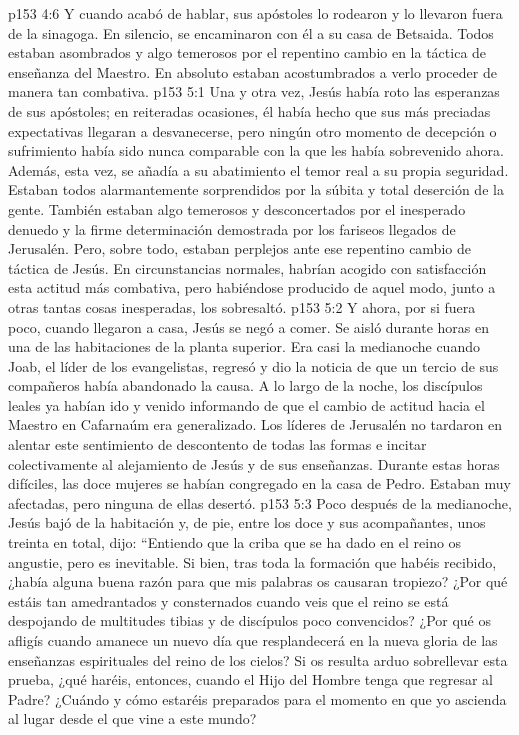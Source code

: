 \vs p153 4:6 Y cuando acabó de hablar, sus apóstoles lo rodearon y lo llevaron fuera de la sinagoga. En silencio, se encaminaron con él a su casa de Betsaida. Todos estaban asombrados y algo temerosos por el repentino cambio en la táctica de enseñanza del Maestro. En absoluto estaban acostumbrados a verlo proceder de manera tan combativa.
\vs p153 5:1 Una y otra vez, Jesús había roto las esperanzas de sus apóstoles; en reiteradas ocasiones, él había hecho que sus más preciadas expectativas llegaran a desvanecerse, pero ningún otro momento de decepción o sufrimiento había sido nunca comparable con la que les había sobrevenido ahora. Además, esta vez, se añadía a su abatimiento el temor real a su propia seguridad. Estaban todos alarmantemente sorprendidos por la súbita y total deserción de la gente. También estaban algo temerosos y desconcertados por el inesperado denuedo y la firme determinación demostrada por los fariseos llegados de Jerusalén. Pero, sobre todo, estaban perplejos ante ese repentino cambio de táctica de Jesús. En circunstancias normales, habrían acogido con satisfacción esta actitud más combativa, pero habiéndose producido de aquel modo, junto a otras tantas cosas inesperadas, los sobresaltó.
\vs p153 5:2 Y ahora, por si fuera poco, cuando llegaron a casa, Jesús se negó a comer. Se aisló durante horas en una de las habitaciones de la planta superior. Era casi la medianoche cuando Joab, el líder de los evangelistas, regresó y dio la noticia de que un tercio de sus compañeros había abandonado la causa. A lo largo de la noche, los discípulos leales ya habían ido y venido informando de que el cambio de actitud hacia el Maestro en Cafarnaúm era generalizado. Los líderes de Jerusalén no tardaron en alentar este sentimiento de descontento de todas las formas e incitar colectivamente al alejamiento de Jesús y de sus enseñanzas. Durante estas horas difíciles, las doce mujeres se habían congregado en la casa de Pedro. Estaban muy afectadas, pero ninguna de ellas desertó.
\vs p153 5:3 Poco después de la medianoche, Jesús bajó de la habitación y, de pie, entre los doce y sus acompañantes, unos treinta en total, dijo: “Entiendo que la criba que se ha dado en el reino os angustie, pero es inevitable. Si bien, tras toda la formación que habéis recibido, ¿había alguna buena razón para que mis palabras os causaran tropiezo? ¿Por qué estáis tan amedrantados y consternados cuando veis que el reino se está despojando de multitudes tibias y de discípulos poco convencidos? ¿Por qué os afligís cuando amanece un nuevo día que resplandecerá en la nueva gloria de las enseñanzas espirituales del reino de los cielos? Si os resulta arduo sobrellevar esta prueba, ¿qué haréis, entonces, cuando el Hijo del Hombre tenga que regresar al Padre? ¿Cuándo y cómo estaréis preparados para el momento en que yo ascienda al lugar desde el que vine a este mundo?

